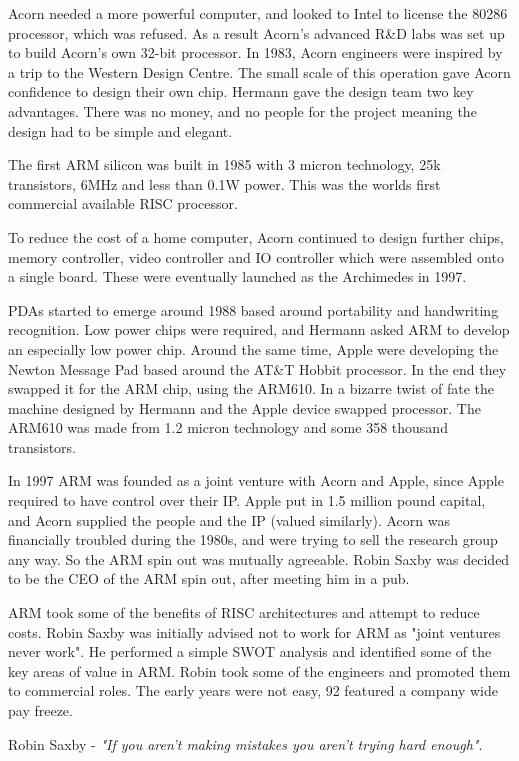 Acorn needed a more powerful computer, and looked to Intel to license the 80286 processor, which was refused. 
As a result Acorn's advanced R\&D labs was set up to build Acorn's own 32-bit processor. 
In 1983, Acorn engineers were inspired by a trip to the Western Design Centre. 
The small scale of this operation gave Acorn confidence to design their own chip. 
Hermann gave the design team two key advantages. 
There was no money, and no people for the project meaning the design had to be simple and elegant.

The first ARM silicon was built in 1985 with 3 micron technology, 25k transistors, 6MHz and less than 0.1W power. 
This was the worlds first commercial available RISC processor. 

To reduce the cost of a home computer, Acorn continued to design further chips, memory controller, video controller and IO controller which were assembled onto a single board. 
These were eventually launched as the Archimedes in 1997.

PDAs started to emerge around 1988 based around portability and handwriting recognition.
Low power chips were required, and Hermann asked ARM to develop an especially low power chip. 
Around the same time, Apple were developing the Newton Message Pad based around the AT\&T Hobbit processor.
In the end they swapped it for the ARM chip, using the ARM610. 
In a bizarre twist of fate the machine designed by Hermann and the Apple device swapped processor. 
The ARM610 was made from 1.2 micron technology and some 358 thousand transistors.

In 1997 ARM was founded as a joint venture with Acorn and Apple, since Apple required to have control over their IP. 
Apple put in 1.5 million pound capital, and Acorn supplied the people and the IP (valued similarly). 
Acorn was financially troubled during the 1980s, and were trying to sell the research group any way. 
So the ARM spin out was mutually agreeable. 
Robin Saxby was decided to be the CEO of the ARM spin out, after meeting him in a pub. 

ARM took some of the benefits of RISC architectures and attempt to reduce costs. 
Robin Saxby was initially advised not to work for ARM as "joint ventures never work". 
He performed a simple SWOT analysis and identified some of the key areas of value in ARM. 
Robin took some of the engineers and promoted them to commercial roles. 
The early years were not easy, 92 featured a company wide pay freeze. 

Robin Saxby - \emph{"If you aren't making mistakes you aren't trying hard enough"}.

